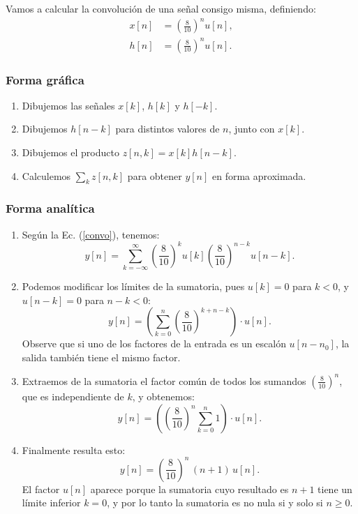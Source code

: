 \documentclass[11pt,a4paper,openany]{book}
\begin{document}
Vamos a calcular la convolución de una señal consigo misma, definiendo:
\begin{align}
	x[n] &= \left( \frac{8}{10}\right)^n u[n], \\
	h[n] &= \left( \frac{8}{10}\right)^n u[n].
\end{align}

\subsubsection{Forma gráfica}

\begin{enumerate}
	\item Dibujemos las señales $x[k]$, $h[k]$ y $h[-k]$.
	\item Dibujemos $h[n-k]$ para distintos valores de $n$, junto con $x[k]$.
	\item Dibujemos el producto $z[n,k] = x[k] h[n-k]$.
	\item Calculemos $\sum_{k}z[n,k]$ para obtener $y[n]$ en forma aproximada.
\end{enumerate}

\subsubsection{Forma analítica}

\begin{enumerate}
	\item Según la Ec. (\ref{convo}), tenemos:
	\begin{equation}
		y[n] = \sum_{k=-\infty}^{\infty} \left( \frac{8}{10}\right)^k u[k] \left( \frac{8}{10}\right)^{n-k} u[n-k].
	\end{equation}
	
	\item Podemos modificar los límites de la sumatoria, pues $u[k] = 0$ para $k < 0$, y $u[n-k] = 0$ para $n - k < 0$:
	\begin{equation}
		y[n] = \left( \sum_{k=0}^{n} \left( \frac{8}{10}\right)^{k+n-k} \right) \cdot u[n].
	\end{equation}
	Observe que si uno de los factores de la entrada es un escalón $u[n - n_{0}]$, la salida también tiene el mismo factor.
	
	\item Extraemos de la sumatoria el factor común de todos los sumandos $\left(\frac{8}{10}\right)^n$, que es independiente de $k$, y obtenemos:
	\begin{equation}
		y[n] = \left( \left( \frac{8}{10}\right)^n \sum_{k=0}^{n} 1 \right) \cdot u[n].
	\end{equation}
	
	\item Finalmente resulta esto:
	\begin{equation}
		y[n] = \left( \frac{8}{10}\right)^n \, (n+1) \, u[n].
	\end{equation}
	El factor $u[n]$ aparece porque la sumatoria cuyo resultado es $n + 1$ tiene un límite inferior $k = 0$, y por lo tanto la sumatoria es no nula si y solo si $n \geq 0$.
\end{enumerate}	
	
\end{document}

